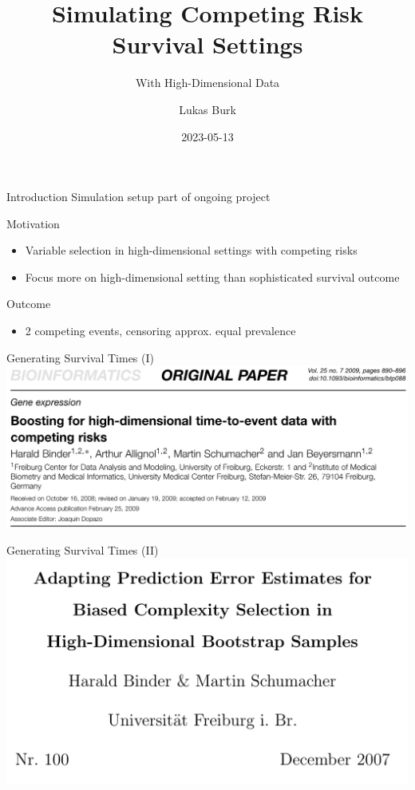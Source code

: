 \documentclass{beamer}
\title{Simulating Competing Risk Survival Settings}
\subtitle{With High-Dimensional Data}
\author{Lukas Burk}
\date{2023-05-13}
\providecommand{\tightlist}{%
  \setlength{\itemsep}{0pt}\setlength{\parskip}{0pt}}
\begin{document}
\frame{\maketitle}

\begin{frame}{Introduction}
\protect\hypertarget{introduction}{}
Simulation setup part of ongoing project

\begin{block}{Motivation}
\protect\hypertarget{motivation}{}
\begin{itemize}
\tightlist
\item
  Variable selection in high-dimensional settings with competing risks
\item
  Focus more on high-dimensional setting than sophisticated survival
  outcome
\end{itemize}
\end{block}

\begin{block}{Outcome}
\protect\hypertarget{outcome}{}
\begin{itemize}
\tightlist
\item
  2 competing events, censoring approx. equal prevalence
\end{itemize}
\end{block}
\end{frame}

\begin{frame}{Generating Survival Times (I)}
\protect\hypertarget{generating-survival-times-i}{}
\includegraphics[width=0.95\linewidth]{img/binder2009}

\textcite{binder2009boostinghighdimensional}
\end{frame}

\begin{frame}{Generating Survival Times (II)}
\protect\hypertarget{generating-survival-times-ii}{}
\includegraphics[width=0.95\linewidth]{img/binder2007}

\textcite{binder2008adaptingprediction}
\end{frame}
\end{document}

